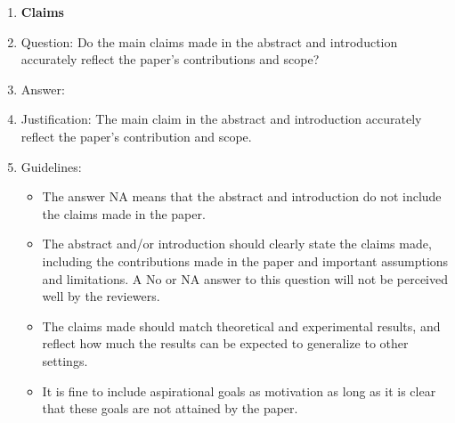 \documentclass{article}
\begin{document}
\begin{enumerate}

\item {\bf Claims}
    \item[] Question: Do the main claims made in the abstract and introduction accurately reflect the paper's contributions and scope?
    \item[] Answer: \answerYes{} %
    \item[] Justification: The main claim in the abstract and introduction accurately reflect the paper's contribution and scope.
    \item[] Guidelines:
    \begin{itemize}
        \item The answer NA means that the abstract and introduction do not include the claims made in the paper.
        \item The abstract and/or introduction should clearly state the claims made, including the contributions made in the paper and important assumptions and limitations. A No or NA answer to this question will not be perceived well by the reviewers. 
        \item The claims made should match theoretical and experimental results, and reflect how much the results can be expected to generalize to other settings. 
        \item It is fine to include aspirational goals as motivation as long as it is clear that these goals are not attained by the paper. 
    \end{itemize}


\end{enumerate}
\end{document}
